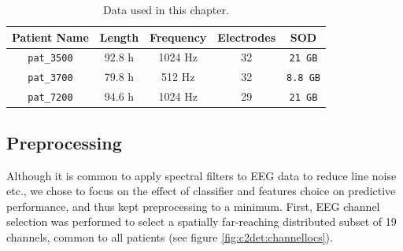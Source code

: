 \begin{table}[h]
\centering
\renewcommand{\arraystretch}{1.3}

\caption{Data used in this chapter.}
\label{table:data}

\begin{tabular}{|c|c|c|c|c|}
\hline
\textbf{Patient Name} & \textbf{Length} & \textbf{Frequency} & \textbf{Electrodes} & \textbf{SOD} \\
\hline
\verb|pat_3500| & 92.8 h & 1024 Hz & 32 & \texttt{21 GB} \\
\hline
\verb|pat_3700| & 79.8 h & 512 Hz & 32 & \texttt{8.8 GB}\\
\hline
\verb|pat_7200| & 94.6 h & 1024 Hz & 29 & \texttt{21 GB}\\
\hline
\end{tabular}
\end{table}


\subsection{Preprocessing}
Although it is common to apply spectral filters to EEG data to reduce line noise etc., we chose to focus on the effect of classifier and features choice on predictive performance, and thus kept preprocessing to a minimum.
First, EEG channel selection was performed to select a spatially far-reaching distributed subset of 19 channels, common to all patients (see figure \ref{fig:c2det:channellocs}).



